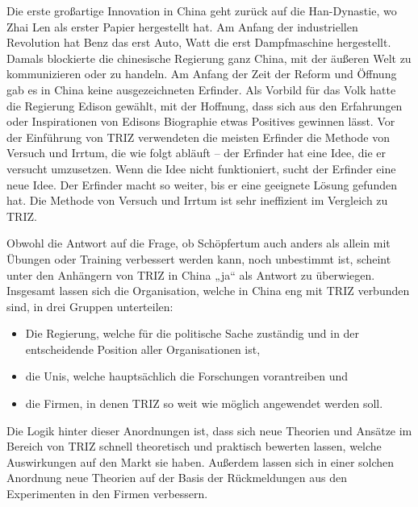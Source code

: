 \documentclass[11pt,a4paper]{article}
\begin{document}
Die erste großartige Innovation in China geht zurück auf die Han-Dynastie, wo
Zhai Len als erster Papier hergestellt hat. Am Anfang der industriellen
Revolution hat Benz das erst Auto, Watt die erst Dampfmaschine hergestellt.
Damals blockierte die chinesische Regierung ganz China, mit der äußeren Welt
zu kommunizieren oder zu handeln. Am Anfang der Zeit der Reform und Öffnung
gab es in China keine ausgezeichneten Erfinder. Als Vorbild für das Volk hatte
die Regierung Edison gewählt, mit der Hoffnung, dass sich aus den Erfahrungen
oder Inspirationen von Edisons Biographie etwas Positives gewinnen lässt. Vor
der Einführung von TRIZ verwendeten die meisten Erfinder die Methode von
Versuch und Irrtum, die wie folgt abläuft -- der Erfinder hat eine Idee, die
er versucht umzusetzen. Wenn die Idee nicht funktioniert, sucht der Erfinder
eine neue Idee. Der Erfinder macht so weiter, bis er eine geeignete Lösung
gefunden hat. Die Methode von Versuch und Irrtum ist sehr ineffizient im
Vergleich zu TRIZ.

Obwohl die Antwort auf die Frage, ob Schöpfertum auch anders als allein mit
Übungen oder Training verbessert werden kann, noch unbestimmt ist, scheint
unter den Anhängern von TRIZ in China „ja“ als Antwort zu überwiegen.
Insgesamt lassen sich die Organisation, welche in China eng mit TRIZ verbunden
sind, in drei Gruppen unterteilen: 
\begin{itemize}
\item Die Regierung, welche für die politische Sache zuständig und in der
  entscheidende Position aller Organisationen ist,
\item die Unis, welche hauptsächlich die Forschungen vorantreiben und
\item die Firmen, in denen TRIZ so weit wie möglich angewendet werden soll.
\end{itemize}
Die Logik hinter dieser Anordnungen ist, dass sich neue Theorien und Ansätze
im Bereich von TRIZ schnell theoretisch und praktisch bewerten lassen, welche
Auswirkungen auf den Markt sie haben. Außerdem lassen sich in einer solchen
Anordnung neue Theorien auf der Basis der Rückmeldungen aus den Experimenten
in den Firmen verbessern.
\end{document}

